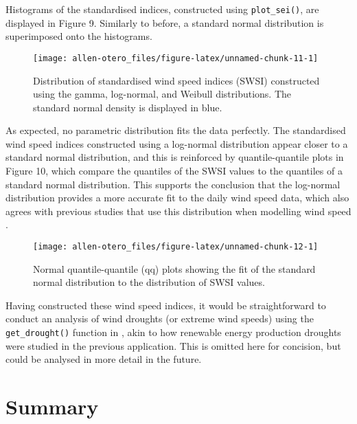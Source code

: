 Histograms of the standardised indices, constructed using \texttt{plot\_sei()}, are displayed in Figure 9. Similarly to before, a standard normal distribution is superimposed onto the histograms.

\begin{figure}

{\centering \texttt{[image: allen-otero\_files/figure-latex/unnamed-chunk-11-1]} 

}

\caption{Distribution of standardised wind speed indices (SWSI) constructed using the gamma, log-normal, and Weibull distributions. The standard normal density is displayed in blue.}\label{fig:unnamed-chunk-11}
\end{figure}

As expected, no parametric distribution fits the data perfectly. The standardised wind speed indices constructed using a log-normal distribution appear closer to a standard normal distribution, and this is reinforced by quantile-quantile plots in Figure 10, which compare the quantiles of the SWSI values to the quantiles of a standard normal distribution. This supports the conclusion that the log-normal distribution provides a more accurate fit to the daily wind speed data, which also agrees with previous studies that use this distribution when modelling wind speed \citep[e.g.][]{KolluEtAl2012,BaranLerch2015}.

\begin{figure}

{\centering \texttt{[image: allen-otero\_files/figure-latex/unnamed-chunk-12-1]} 

}

\caption{Normal quantile-quantile (qq) plots showing the fit of the standard normal distribution to the distribution of SWSI values.}\label{fig:unnamed-chunk-12}
\end{figure}

Having constructed these wind speed indices, it would be straightforward to conduct an analysis of wind droughts (or extreme wind speeds) using the \texttt{get\_drought()} function in , akin to how renewable energy production droughts were studied in the previous application. This is omitted here for concision, but could be analysed in more detail in the future.

\section{Summary}\label{summary}

